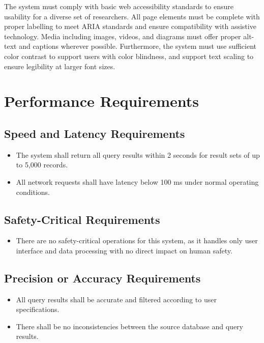 \documentclass[12pt]{article}
\begin{document}
\par{
   The system must comply with basic web accessibility standards to ensure usability for a diverse set of researchers. All page elements must be complete with proper labelling to meet ARIA standards and ensure compatibility with assistive technology. Media including images, videos, and diagrams must offer proper alt-text and captions wherever possible. Furthermore, the system must use sufficient color contrast to support users with color blindness, and support text scaling to ensure legibility at larger font sizes.   
}

\section{Performance Requirements}

\subsection{Speed and Latency Requirements}
\begin{itemize}
    \item The system shall return all query results within 2 seconds for result sets of up to 5,000 records.
    \item All network requests shall have latency below 100 ms under normal operating conditions.
\end{itemize}

\subsection{Safety-Critical Requirements}
\begin{itemize}
    \item There are no safety-critical operations for this system, as it handles only user interface and data processing with no direct impact on human safety.
\end{itemize}

\subsection{Precision or Accuracy Requirements}
\begin{itemize}
    \item All query results shall be accurate and filtered according to user specifications.
    \item There shall be no inconsistencies between the source database and query results.
\end{itemize}
\end{document}
